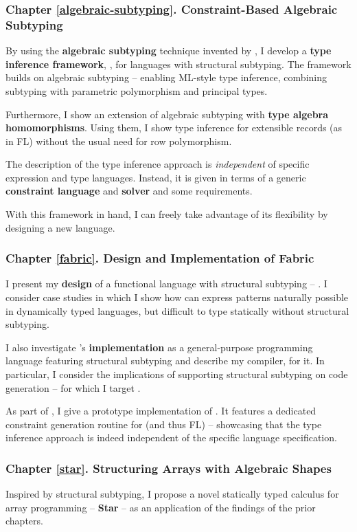 \subsubsection{Chapter \ref{algebraic-subtyping}. Constraint-Based Algebraic Subtyping}

By using the \textbf{algebraic subtyping} technique invented by \textcite{dolan-thesis}, I develop a \textbf{type inference framework}, \inference{}, for languages with structural subtyping. 
The framework builds on algebraic subtyping -- enabling ML-style type inference, combining subtyping with parametric polymorphism and principal types. 

Furthermore, I show an extension of algebraic subtyping with \textbf{type algebra homomorphisms}. Using them, I show type inference for extensible records (as in FL) without the usual need for row polymorphism.

The description of the type inference approach is \emph{independent} of specific expression and type languages. Instead, it is given in terms of a generic \textbf{constraint language} and \textbf{solver} and some requirements. 

With this framework in hand, I can freely take advantage of its flexibility by designing a new language.

\subsubsection{Chapter \ref{fabric}. Design and Implementation of Fabric}
I present my \textbf{design} of a functional language with structural subtyping -- \textbf{\fabric{}}. 
I consider case studies in which I show how \fabric{} can express patterns naturally possible in dynamically typed languages, but difficult to type statically without structural subtyping. 

I also investigate \fabric{}'s \textbf{implementation} as a general-purpose programming language featuring structural subtyping and describe my compiler, \compiler{} for it. In particular, I consider the implications of supporting structural subtyping on code generation -- for which I target \wasm{}.

As part of \compiler{}, I give a prototype implementation of \inference{}. It features a dedicated constraint generation routine for \fabric{} (and thus FL) -- showcasing that the type inference approach is indeed independent of the specific language specification.

\subsubsection{Chapter \ref{star}. Structuring Arrays with Algebraic Shapes}
Inspired by structural subtyping, I propose a novel statically typed calculus for array  programming -- \textbf{Star} -- as an application of the findings of the prior chapters. 

